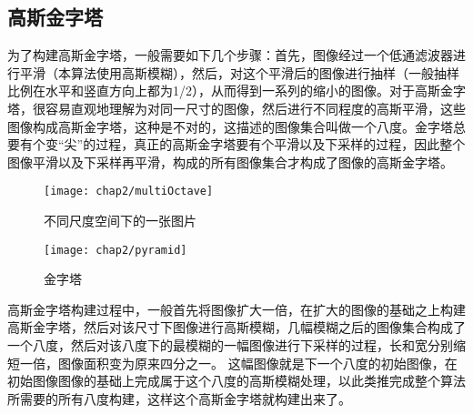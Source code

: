     \subsection{高斯金字塔}
      为了构建高斯金字塔，一般需要如下几个步骤\cite{sivic2005discovering}：首先，图像经过一个低通滤波器进行平滑（本算法使用高斯模糊），然后，对这个平滑后的图像进行抽样（一般抽样比例在水平和竖直方向上都为1/2），从而得到一系列的缩小的图像。对于高斯金字塔，很容易直观地理解为对同一尺寸的图像，然后进行不同程度的高斯平滑，这些图像构成高斯金字塔，这种是不对的，这描述的图像集合叫做一个八度。金字塔总要有个变“尖”的过程，真正的高斯金字塔要有个平滑以及下采样的过程，因此整个图像平滑以及下采样再平滑，构成的所有图像集合才构成了图像的高斯金字塔。
      \begin{figure}[htp]
        \centering
        \texttt{[image: chap2/multiOctave]}
        \caption{不同尺度空间下的一张图片}
      \end{figure}
      \begin{wrapfigure}{r}{0.25\textwidth}
        \centering
        \texttt{[image: chap2/pyramid]}
        \caption{金字塔}
      \end{wrapfigure}
      高斯金字塔构建过程中，一般首先将图像扩大一倍，在扩大的图像的基础之上构建高斯金字塔，然后对该尺寸下图像进行高斯模糊，几幅模糊之后的图像集合构成了一个八度，然后对该八度下的最模糊的一幅图像进行下采样的过程，长和宽分别缩短一倍，图像面积变为原来四分之一。
      这幅图像就是下一个八度的初始图像，在初始图像图像的基础上完成属于这个八度的高斯模糊处理，以此类推完成整个算法所需要的所有八度构建，这样这个高斯金字塔就构建出来了。
